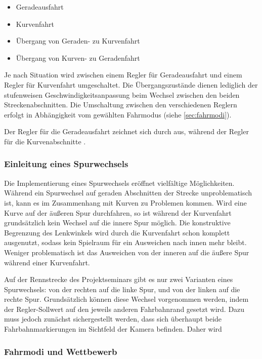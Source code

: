 \begin{itemize}
	\item Geradeausfahrt
	\item Kurvenfahrt
	\item Übergang von Geraden- zu Kurvenfahrt
	\item Übergang von Kurven- zu Geradenfahrt
\end{itemize}

Je nach Situation wird zwischen einem Regler für Geradeausfahrt und einem Regler für Kurvenfahrt umgeschaltet. Die Übergangszustände dienen lediglich der stufenweisen Geschwindigkeitsanpassung beim Wechsel zwischen den beiden Streckenabschnitten. Die Umschaltung zwischen den verschiedenen Reglern erfolgt in Abhängigkeit vom gewählten Fahrmodus (siehe \autoref{sec:fahrmodi}).

Der Regler für die Geradeausfahrt zeichnet sich durch  aus, während der Regler für die Kurvenabschnitte .


\subsubsection{Einleitung eines Spurwechsels}
\label{sec:spurwechsel}

Die Implementierung eines Spurwechsels eröffnet vielfältige Möglichkeiten. Während ein Spurwechsel auf geraden Abschnitten der Strecke unproblematisch ist, kann es im Zusammenhang mit Kurven zu Problemen kommen. Wird eine Kurve auf der äußeren Spur durchfahren, so ist während der Kurvenfahrt grundsätzlich kein Wechsel auf die innere Spur möglich. Die konstruktive Begrenzung des Lenkwinkels wird durch die Kurvenfahrt schon komplett ausgenutzt, sodass kein Spielraum für ein Ausweichen nach innen mehr bleibt. Weniger problematisch ist das Ausweichen von der inneren auf die äußere Spur während einer Kurvenfahrt.

Auf der Rennstrecke des Projektseminars gibt es nur zwei Varianten eines Spurwechsels: von der rechten auf die linke Spur, und von der linken auf die rechte Spur. Grundsätzlich können diese Wechsel vorgenommen werden, indem der Regler-Sollwert auf den jeweils anderen Fahrbahnrand gesetzt wird. Dazu muss jedoch zunächst sichergestellt werden, dass sich überhaupt beide Fahrbahnmarkierungen im Sichtfeld der Kamera befinden. Daher wird 


\subsubsection{Fahrmodi und Wettbewerb}
\label{sec:fahrmodi}

